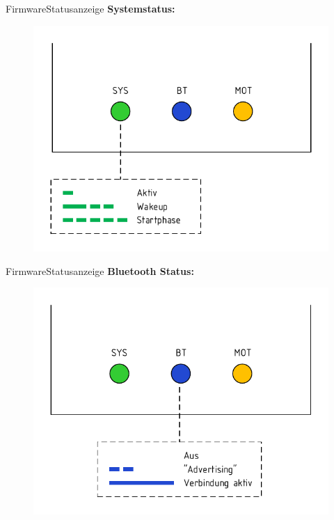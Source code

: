\documentclass{beamer}
\begin{document}
\begin{frame}{Firmware}{Statusanzeige}
    \textbf{Systemstatus:}
    \begin{figure}[H]
        \includegraphics[width=.8\textwidth]{./img/Systemstatus.pdf}
    \end{figure}
\end{frame}

\begin{frame}{Firmware}{Statusanzeige}
    \textbf{Bluetooth Status:}
    \begin{figure}[H]
        \includegraphics[width=.8\textwidth]{./img/Bluetoothstatus.pdf}
    \end{figure}
\end{frame}
\end{document}
